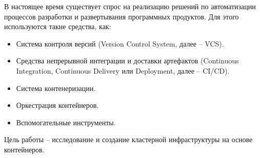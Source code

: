 \Introduction

В настоящее время существует спрос на реализацию решений по автоматизации процессов разработки и развертывания программных продуктов. Для этого используются такие средства, как:

\begin{itemize}
    \item Система контроля версий (Version Control System, далее -- VCS).
    \item Средства непрерывной интеграции и доставки артефактов (Continuous Integration, Continuous Delivery или Deployment, далее -- CI/CD).
    \item Система контенеризации.
    \item Оркестрация контейнеров.
    \item Вспомогательные инструменты.
\end{itemize}

Цель работы -- исследование и создание кластерной инфраструктуры на основе контейнеров.
